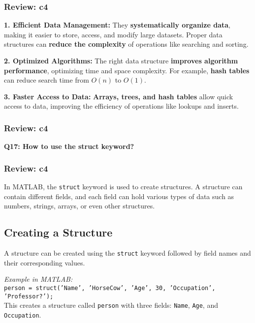 \documentclass[
	11pt, %
]{beamer}
\begin{document}
\begin{frame}
	\frametitle{Review: c4}

    \textbf{1. Efficient Data Management:}  
    They \textbf{systematically organize data}, making it easier to store, access, and modify large datasets. Proper data structures can \textbf{reduce the complexity} of operations like searching and sorting.

\vspace{0.5cm}

    \textbf{2. Optimized Algorithms:}  
    The right data structure \textbf{improves algorithm performance}, optimizing time and space complexity. For example, \textbf{hash tables} can reduce search time from $O(n)$ to \textbf{$O(1)$}.

\vspace{0.5cm}

    \textbf{3. Faster Access to Data:}  
    \textbf{Arrays, trees, and hash tables} allow quick access to data, improving the efficiency of operations like lookups and inserts.

\end{frame}

\begin{frame}
	\frametitle{Review: c4}

	\textbf{Q17: How to use the struct keyword?}

\end{frame}


\begin{frame}
	\frametitle{Review: c4}
 
 In MATLAB, the \texttt{struct} keyword is used to create structures. A structure can contain different fields, and each field can hold various types of data such as numbers, strings, arrays, or even other structures.

\vspace{0.5cm}

    \subsection*{Creating a Structure}
    A structure can be created using the \texttt{struct} keyword followed by field names and their corresponding values.

\vspace{0.5cm}

    \textit{Example in MATLAB:} \\
    
    \texttt{person = struct('Name', 'HorseCow', 'Age', 30, 'Occupation', 'Professor?');} \\
    
    This creates a structure called \texttt{person} with three fields: \texttt{Name}, \texttt{Age}, and \texttt{Occupation}.
\end{frame}
\end{document}
